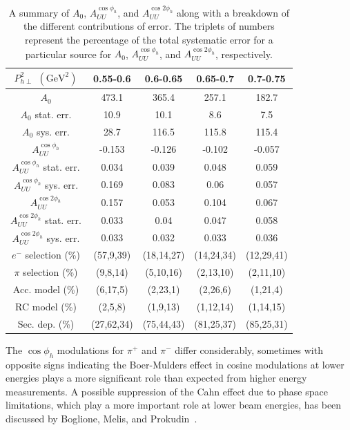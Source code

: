 \documentclass[aps,prl,twocolumn,showpacs,superscriptaddress,groupedaddress]{revtex4-1}  %
\begin{document}
\begin{table}
\begin{center}
\begin{tabular}{ |c||c|c|c|c| } 

  \hline
  $P_{h\perp}^2$ $(\text{GeV}^2)$ & 0.55-0.6 & 0.6-0.65 & 0.65-0.7 & 0.7-0.75 \\
  \hline
  \hline
  $A_0$ & 473.1 & 365.4 & 257.1 & 182.7 \\
  \hline
  $A_0$ stat. err. & 10.9 & 10.1 & 8.6 & 7.5 \\
  \hline
  $A_0$ sys. err. & 28.7 & 116.5 & 115.8 & 115.4 \\
  \hline
  $A_{UU}^{\cos \phi_h}$ & -0.153 & -0.126 & -0.102 & -0.057 \\
  \hline
  $A_{UU}^{\cos \phi_h}$ stat. err. & 0.034 & 0.039 & 0.048 & 0.059 \\
  \hline
  $A_{UU}^{\cos \phi_h}$ sys. err. & 0.169 & 0.083 & 0.06 & 0.057 \\
  \hline
  $A_{UU}^{\cos 2 \phi_h}$ & 0.157 & 0.053 & 0.104 & 0.067 \\
  \hline
  $A_{UU}^{\cos 2 \phi_h}$ stat. err. & 0.033 & 0.04 & 0.047 & 0.058 \\
  \hline
  $A_{UU}^{\cos 2 \phi_h}$ sys. err. & 0.033 & 0.032 & 0.033 & 0.036 \\
  \hline
  $e^-$ selection (\%) & (57,9,39) & (18,14,27) & (14,24,34) & (12,29,41) \\
  \hline
  $\pi$ selection (\%) & (9,8,14) & (5,10,16) & (2,13,10) & (2,11,10) \\
  \hline
  Acc. model (\%) & (6,17,5) & (2,23,1) & (2,26,6) & (1,21,4) \\
  \hline
  RC model (\%) & (2,5,8) & (1,9,13) & (1,12,14) & (1,14,15) \\
  \hline
  Sec. dep. (\%) & (27,62,34) & (75,44,43) & (81,25,37) & (85,25,31) \\
  \hline

\end{tabular}
\end{center}
\caption{A summary of $A_0$, $A_{UU}^{\cos \phi_h}$, and $A_{UU}^{\cos 2 \phi_h}$ along with a breakdown of the different contributions of error. The triplets of numbers represent the percentage of the total systematic error for a particular source for $A_0$, $A_{UU}^{\cos \phi_h}$, and $A_{UU}^{\cos 2 \phi_h}$, respectively.}
\label{tab:A0AcAcc_PT2bins_x1QQ1z8}
\end{table}

The $\cos \phi_h$ modulations for $\pi^+$ and $\pi^-$ differ considerably, sometimes with opposite signs indicating the Boer-Mulders effect in cosine modulations at lower energies plays a more significant role than expected from higher energy measurements.
A possible suppression of the Cahn effect due to phase space limitations, which play a more important role at lower beam energies, has been discussed by Boglione, Melis, and Prokudin~\cite{Boglione:2011wm}.
\end{document}
